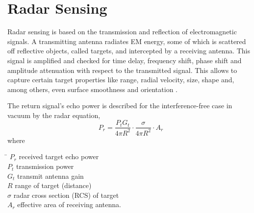 \section{Radar Sensing}\label{radar}

Radar sensing is based on the transmission and reflection of
electromagnetic signals. A transmitting antenna radiates EM energy, some
of which is scattered off reflective objects, called targets, and
intercepted by a receiving antenna. This signal is amplified and checked
for time delay, frequency shift, phase shift and amplitude attenuation
with respect to the transmitted signal. This allows to capture certain
target properties like range, radial velocity, size, shape and, among
others, even surface smoothness and orientation \cite{Skolnik2008}.

\begin{minipage}{\textwidth} %
The return signal's echo power is described for the interference-free
case in vacuum by the radar equation,
\begin{equation} \label{eq:radar}
    P_r =  \frac{P_t G_t}{4\pi R^2} \cdot \frac{\sigma}{4\pi R^2} \cdot A_r
\end{equation}
where
\begin{tabbing}
\hspace{1cm} \= \kill
$P_r$ \> received target echo power \\
$P_t$ \> transmission power \\
$G_t$ \> transmit antenna gain \\
$R$ \> range of target (distance) \\
$\sigma$ \> radar cross section (RCS) of target \\
$A_r$ \> effective area of receiving antenna.
\end{tabbing}
\end{minipage}

